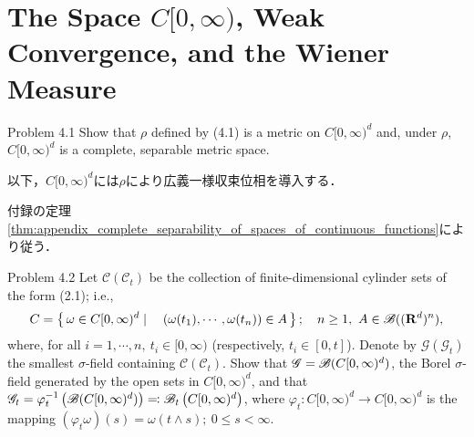 \section{The Space $C[0,\infty)$, Weak Convergence, and the Wiener Measure}
	\begin{itembox}[l]{Problem 4.1}
		Show that $\rho$ defined by (4.1) is a metric on $C[0,\infty)^d$ and, under $\rho$, 
		$C[0,\infty)^d$ is a complete, separable metric space.
	\end{itembox}
	以下，$C[0,\infty)^d$には$\rho$により広義一様収束位相を導入する．
	
	\begin{prf}
		付録の定理\ref{thm:appendix_complete_separability_of_spaces_of_continuous_functions}により従う．
		\QED
	\end{prf}

\begin{itembox}[l]{Problem 4.2}\label{chapter_2_problem_4_2}
	Let $\mathscr{C}(\mathscr{C}_t)$ be the collection of finite-dimensional cylinder sets of the form (2.1); i.e.,
	\begin{align}
		C = \left\{\, \omega \in C[0,\infty)^d \mid \quad (\omega(t_1),\cdots,\omega(t_n)) \in A\, \right\};
		\quad n \geq 1,\ A \in \mathscr{B}((\mathbf{R}^d)^n),
	\end{align}
	where, for all $i=1,\cdots,n,\ t_i \in [0,\infty)$ (respectively, $t_i \in [0,t]$).
	Denote by $\mathscr{G}(\mathscr{G}_t)$ the smallest $\sigma$-field containing $\mathscr{C}(\mathscr{C}_t)$.
	Show that $\mathscr{G} = \mathscr{B}(C[0,\infty)^d)$, the Borel $\sigma$-field generated by the open sets in
	$C[0,\infty)^d$, and that $\mathscr{G}_t = \varphi_t^{-1}\left( \mathscr{B}(C[0,\infty)^d) \right) \eqqcolon
	\mathscr{B}_t\left( C[0,\infty)^d \right)$, where $\varphi_t:C[0,\infty)^d \longrightarrow C[0,\infty)^d$ is the
	mapping $(\varphi_t\omega)(s) = \omega(t \wedge s);\ 0 \leq s < \infty$.
\end{itembox}

